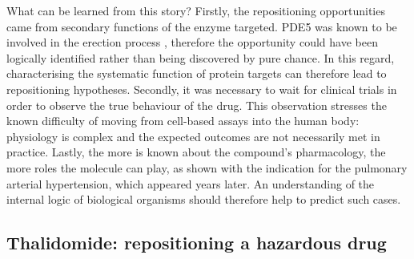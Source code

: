 What can be learned from this story? Firstly, the repositioning opportunities came from secondary functions of the enzyme targeted. PDE5 was known to be involved in the erection process \citep{krall1988characterization}, therefore the opportunity could have been logically identified rather than being discovered by pure chance. In this regard, characterising the systematic function of protein targets can therefore lead to repositioning hypotheses. Secondly, it was necessary to wait for clinical trials in order to observe the true behaviour of the drug. This observation stresses the known difficulty of moving from cell-based assays into the human body: physiology is complex and the expected outcomes are not necessarily met in practice. Lastly, the more is known about the compound's pharmacology, the more roles the molecule can play, as shown with the indication for the pulmonary arterial hypertension, which appeared years later. An understanding of the internal logic of biological organisms should therefore help to predict such cases.

\subsection{Thalidomide: repositioning a hazardous drug}

